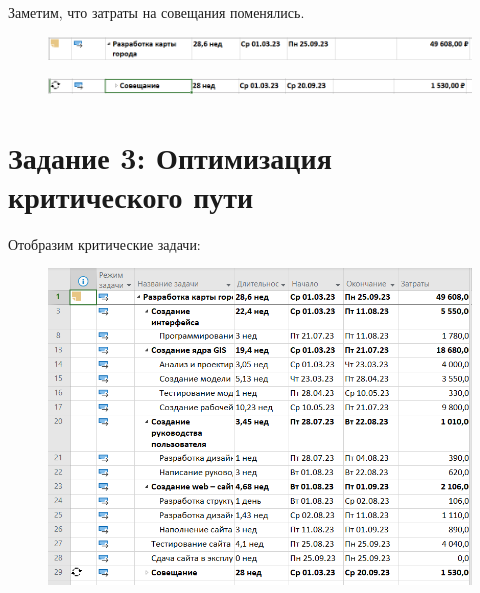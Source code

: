 Заметим, что затраты на совещания поменялись.

\begin{figure}[H]
	\begin{center}
		\includegraphics[width=\textwidth]{imgs/task_2_7.png}
	\end{center}
\end{figure}

\begin{figure}[H]
	\begin{center}
		\includegraphics[width=\textwidth]{imgs/task_2_8.png}
	\end{center}
\end{figure}

\section*{Задание 3: Оптимизация критического пути}

Отобразим критические задачи:

\begin{figure}[H]
	\begin{center}
		\includegraphics[width=\textwidth]{imgs/task_3_0.png}
	\end{center}
\end{figure}

